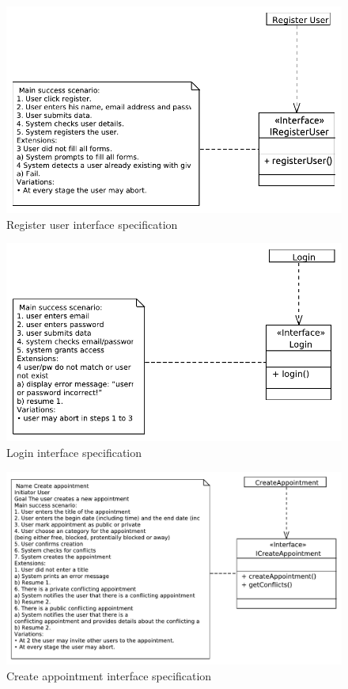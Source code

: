 \documentclass[a4paper]{scrartcl}
\begin{document}
\begin{figure}[H]
	\includegraphics[width=1\textwidth]{pictures/RegisterUser}
	\caption{Register user interface specification}
\end{figure}
\begin{figure}[H]
	\includegraphics[width=1\textwidth]{pictures/Login}
	\caption{Login interface specification}
\end{figure}
\begin{figure}[H]
	\includegraphics[width=1\textwidth]{pictures/CreateAppointment}
	\caption{Create appointment interface specification}
\end{figure}
\end{document}
